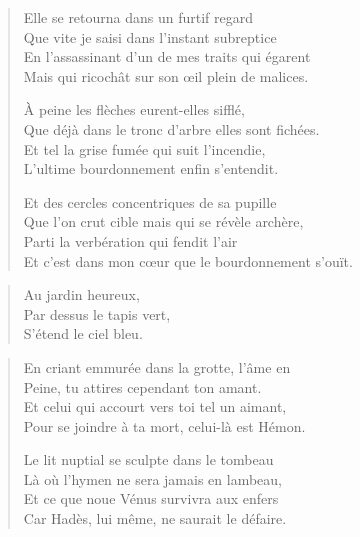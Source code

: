 \begin{verse}\quatrain
  Elle se retourna dans un furtif regard\\  %
  Que vite je saisi dans l’instant subreptice\\   %
  En l’assassinant d’un de mes traits qui égarent\\   %
  Mais qui ricochât sur son œil plein de malices. 

  À peine les flèches eurent-elles sifflé,\\   %
  Que déjà dans le tronc d’arbre elles sont fichées.\\   %
  Et tel la grise fumée  qui suit  l’incendie,\\   %
  L’ultime bourdonnement enfin s’entendit. 

  Et des cercles concentriques de sa pupille\\   %
  Que l’on crut cible mais qui se révèle archère,\\   %
  Parti la verbération qui fendit l’air\\   %
  Et c’est dans mon cœur que le bourdonnement s’ouït. 
\end{verse}



\begin{verse}\haiku
  Au jardin heureux,\\  %
  Par dessus le tapis  vert,\\  %
  S’étend le ciel bleu.
\end{verse}

\begin{verse}\quatrain
  En criant emmurée dans la grotte, l’âme en\\  %
  Peine, tu attires cependant ton amant.\\  %
  Et celui qui accourt vers toi tel un aimant,\\  %
  Pour se joindre à ta mort, celui-là est Hémon.

  Le lit nuptial se sculpte dans le tombeau\\  %
  Là où l’hymen ne sera jamais en lambeau,\\  %
  Et ce que noue Vénus survivra aux enfers\\  %
  Car Hadès, lui même, ne saurait le défaire. 
\end{verse}


